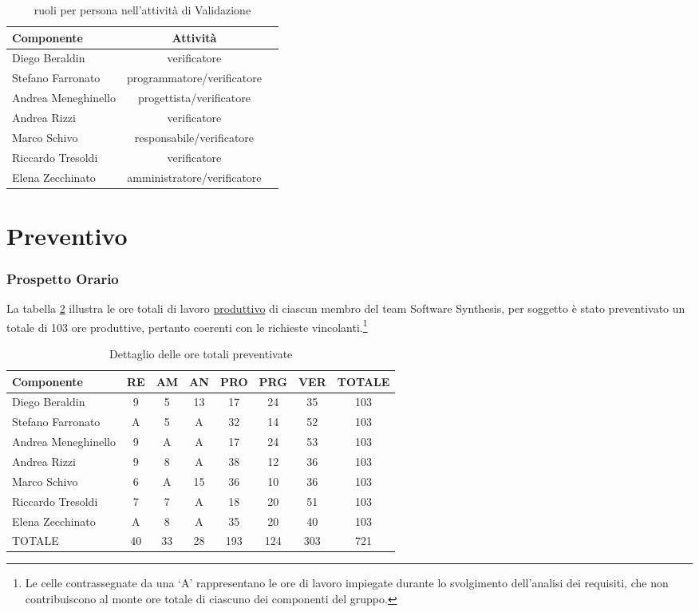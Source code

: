 \begin{table}[h!]
\centering
\begin{tabular}{|l|c|c|}
\hline
Componente& Attività\\
\hline
Diego Beraldin &verificatore\\
Stefano Farronato & programmatore/verificatore\\
Andrea Meneghinello &progettista/verificatore\\
Andrea Rizzi &verificatore\\
Marco Schivo &responsabile/verificatore\\
Riccardo Tresoldi &verificatore\\
Elena Zecchinato &amministratore/verificatore\\
\hline
\end{tabular}
\caption{ruoli per persona nell'attività di Validazione}\label{tab:ruolivv3}
\end{table}
\clearpage

\section{Preventivo}

\subsubsection{Prospetto Orario}
La tabella \ref{tab:oretotali} illustra le ore totali di lavoro \underline{produttivo} di ciascun membro del team Software Synthesis, per soggetto è stato preventivato un totale di 103 ore produttive, pertanto coerenti con le richieste vincolanti.\footnote{%
  Le celle contrassegnate da una `A' rappresentano le ore di lavoro impiegate durante lo svolgimento dell'analisi dei requisiti, che non contribuiscono al monte ore totale di ciascuno dei componenti del gruppo.
}

\begin{table}[h]
\centering
\begin{tabular}{|l|c|c|c|c|c|c|c|}
\hline
Componente& RE& AM& AN& PRO& PRG& VER& TOTALE\\
\hline
Diego Beraldin & 9& 5& 13& 17& 24& 35& 103\\
Stefano Farronato & A& 5& A& 32& 14& 52&  103\\
Andrea Meneghinello & 9& A& A& 17& 24& 53& 103\\
Andrea Rizzi & 9& 8& A& 38& 12& 36& 103\\
Marco Schivo & 6& A& 15& 36& 10& 36& 103\\
Riccardo Tresoldi & 7& 7& A& 18& 20& 51& 103\\
Elena Zecchinato & A& 8& A& 35& 20& 40& 103\\
\hline
TOTALE&40&33&28&193&124&303&721\\
\hline
\end{tabular}
\caption{Dettaglio delle ore totali preventivate}\label{tab:oretotali}
\end{table}

